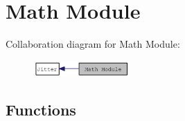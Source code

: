 \hypertarget{group__mathmod}{
\section{Math Module}
\label{group__mathmod}
}


Collaboration diagram for Math Module:\nopagebreak
\begin{figure}[H]
\begin{center}
\leavevmode
\includegraphics[width=104pt]{group__mathmod}
\end{center}
\end{figure}
\subsection*{Functions}
